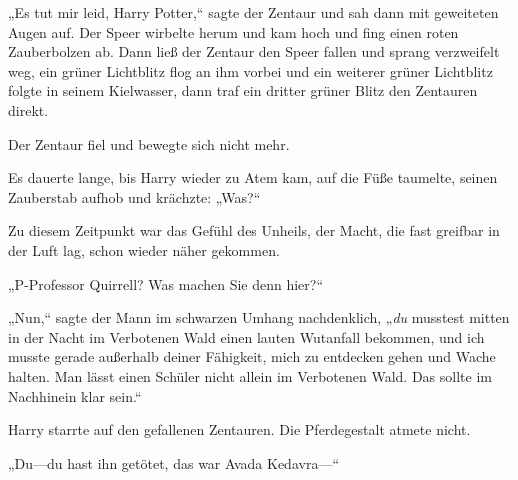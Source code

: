 „Es tut mir leid, Harry Potter,“ sagte der Zentaur und sah dann mit geweiteten Augen auf. Der Speer wirbelte herum und kam hoch und fing einen roten Zauberbolzen ab. Dann ließ der Zentaur den Speer fallen und sprang verzweifelt weg, ein grüner Lichtblitz flog an ihm vorbei und ein weiterer grüner Lichtblitz folgte in seinem Kielwasser, dann traf ein dritter grüner Blitz den Zentauren direkt.

Der Zentaur fiel und bewegte sich nicht mehr.

Es dauerte lange, bis Harry wieder zu Atem kam, auf die Füße taumelte, seinen Zauberstab aufhob und krächzte: „Was?“

Zu diesem Zeitpunkt war das Gefühl des Unheils, der Macht, die fast greifbar in der Luft lag, schon wieder näher gekommen.

„P-Professor Quirrell? Was machen Sie denn hier?“

„Nun,“ sagte der Mann im schwarzen Umhang nachdenklich, „\emph{du} musstest mitten in der Nacht im Verbotenen Wald einen lauten Wutanfall bekommen, und ich musste gerade außerhalb deiner Fähigkeit, mich zu entdecken gehen und Wache halten. Man lässt einen Schüler nicht allein im Verbotenen Wald. Das sollte im Nachhinein klar sein.“

Harry starrte auf den gefallenen Zentauren. Die Pferdegestalt atmete nicht.

„Du—du hast ihn getötet, das war Avada Kedavra—“

